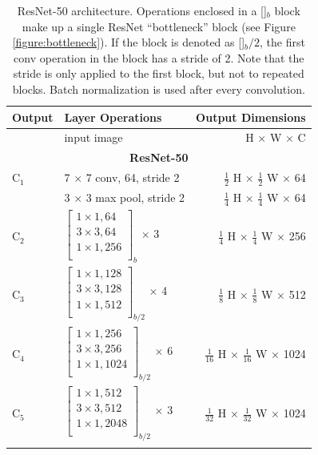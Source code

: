 {
\begin{longtable}{llr}
\toprule
\textbf{Output} & \textbf{Layer Operations} & \textbf{Output Dimensions} \\
\midrule\midrule
 & input image & H $\times$ W $\times$ C \\
\midrule
\multicolumn{3}{c}{\textbf{ResNet-50}}\\
\midrule
C$_1$ & 7 $\times$ 7 conv, 64, stride 2 & $\tfrac{1}{2}$ H $\times$ $\tfrac{1}{2}$ W $\times$ 64 \\

& 3 $\times$ 3 max pool, stride 2 & $\tfrac{1}{4}$ H $\times$ $\tfrac{1}{4}$ W $\times$ 64 \\

C$_2$ &
$\begin{bmatrix}
1 \times 1, 64 \\
3 \times 3, 64 \\
1 \times 1, 256 \\
\end{bmatrix}_b$ $\times$ 3
& $\tfrac{1}{4}$ H $\times$ $\tfrac{1}{4}$ W $\times$ 256 \\
\midrule
C$_3$ &
$\begin{bmatrix}
1 \times 1, 128 \\
3 \times 3, 128 \\
1 \times 1, 512 \\
\end{bmatrix}_{b/2}$ $\times$ 4
& $\tfrac{1}{8}$ H $\times$ $\tfrac{1}{8}$ W $\times$ 512 \\
\midrule
C$_4$ &
$\begin{bmatrix}
1 \times 1, 256 \\
3 \times 3, 256 \\
1 \times 1, 1024 \\
\end{bmatrix}_{b/2}$ $\times$ 6
& $\tfrac{1}{16}$ H $\times$ $\tfrac{1}{16}$ W $\times$ 1024 \\
\midrule
C$_5$ &
$\begin{bmatrix}
1 \times 1, 512 \\
3 \times 3, 512 \\
1 \times 1, 2048 \\
\end{bmatrix}_{b/2}$ $\times$ 3
& $\tfrac{1}{32}$ H $\times$ $\tfrac{1}{32}$ W $\times$ 1024 \\

\bottomrule

\caption {
ResNet-50 \cite{ResNet} architecture.
Operations enclosed in a []$_b$ block make up a single ResNet \enquote{bottleneck}
block (see Figure \ref{figure:bottleneck}). If the block is denoted as []$_b/2$,
the first conv operation in the block has a stride of 2. Note that the stride
is only applied to the first block, but not to repeated blocks.
Batch normalization \cite{BN} is used after every convolution.
}
\label{table:resnet}
\end{longtable}


}

